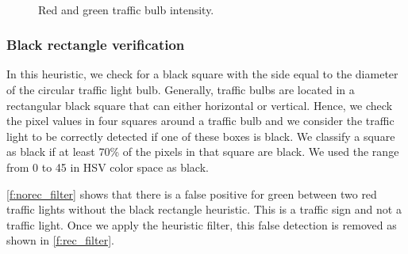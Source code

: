 \begin{figure}[ht]
\centering
{}
\hfill
{}\\

\caption{Red and green traffic bulb intensity.}
\label{f:bulb_int}
\end{figure}


\subsubsection{Black rectangle verification}
In this heuristic, we check for a black square with the side equal to the diameter of the circular traffic light bulb.
Generally, traffic bulbs are located in a rectangular black square that can either horizontal or vertical.
Hence, we check the pixel values in four squares around a traffic bulb and we consider the traffic light to be correctly detected if one of these boxes is black.
We classify a square as black if at least 70\% of the pixels in that square are black.
We used the range from 0 to 45 in HSV color space as black.

\ref{f:norec_filter} shows that there is a false positive for green between two red traffic lights without the black rectangle heuristic.
This is a traffic sign and not a traffic light.
Once we apply the heuristic filter, this false detection is removed as shown in \ref{f:rec_filter}.

